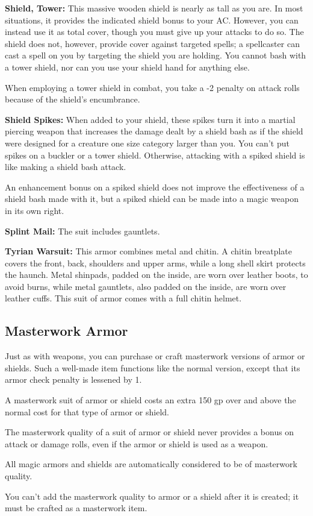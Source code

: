\textbf{Shield, Tower:} This massive wooden shield is nearly as tall as you are. In most situations, it provides the indicated shield bonus to your AC. However, you can instead use it as total cover, though you must give up your attacks to do so. The shield does not, however, provide cover against targeted spells; a spellcaster can cast a spell on you by targeting the shield you are holding. You cannot bash with a tower shield, nor can you use your shield hand for anything else.

When employing a tower shield in combat, you take a -2 penalty on attack rolls because of the shield's encumbrance.

\textbf{Shield Spikes:} When added to your shield, these spikes turn it into a martial piercing weapon that increases the damage dealt by a shield bash as if the shield were designed for a creature one size category larger than you. You can't put spikes on a buckler or a tower shield. Otherwise, attacking with a spiked shield is like making a shield bash attack.

An enhancement bonus on a spiked shield does not improve the effectiveness of a shield bash made with it, but a spiked shield can be made into a magic weapon in its own right.

\textbf{Splint Mail:} The suit includes gauntlets.

\textbf{Tyrian Warsuit:} This armor combines metal and chitin. A chitin breatplate covers the front, back, shoulders and upper arms, while a long shell skirt protects the haunch. Metal shinpads, padded on the inside, are worn over leather boots, to avoid burns, while metal gauntlets, also padded on the inside, are worn over leather cuffs. This suit of armor comes with a full chitin helmet.

\subsection{Masterwork Armor}
Just as with weapons, you can purchase or craft masterwork versions of armor or shields. Such a well-made item functions like the normal version, except that its armor check penalty is lessened by 1.

A masterwork suit of armor or shield costs an extra 150 gp over and above the normal cost for that type of armor or shield.

The masterwork quality of a suit of armor or shield never provides a bonus on attack or damage rolls, even if the armor or shield is used as a weapon.

All magic armors and shields are automatically considered to be of masterwork quality.

You can't add the masterwork quality to armor or a shield after it is created; it must be crafted as a masterwork item.